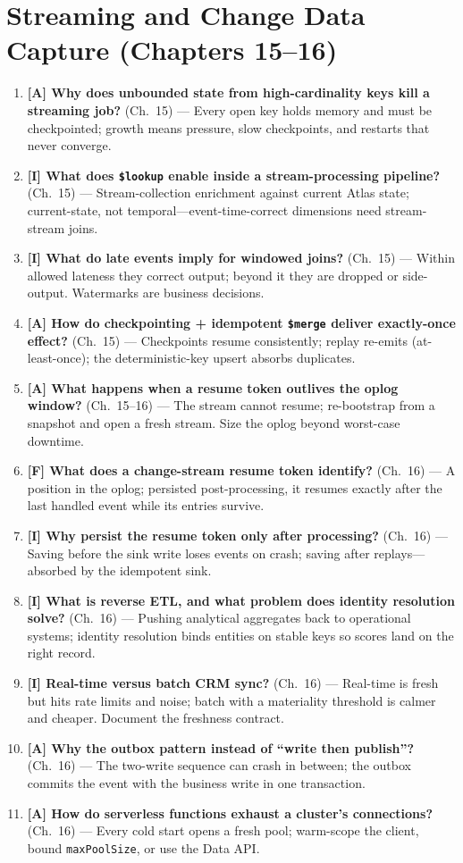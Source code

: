 \section{Streaming and Change Data Capture (Chapters 15--16)}
\begin{enumerate}
    \item \textbf{[A] Why does unbounded state from high-cardinality keys kill a streaming job?} (Ch.~15) --- Every open key holds memory and must be checkpointed; growth means pressure, slow checkpoints, and restarts that never converge.
    \item \textbf{[I] What does \texttt{\$lookup} enable inside a stream-processing pipeline?} (Ch.~15) --- Stream-collection enrichment against current Atlas state; current-state, not temporal---event-time-correct dimensions need stream-stream joins.
    \item \textbf{[I] What do late events imply for windowed joins?} (Ch.~15) --- Within allowed lateness they correct output; beyond it they are dropped or side-output. Watermarks are business decisions.
    \item \textbf{[A] How do checkpointing + idempotent \texttt{\$merge} deliver exactly-once effect?} (Ch.~15) --- Checkpoints resume consistently; replay re-emits (at-least-once); the deterministic-key upsert absorbs duplicates.
    \item \textbf{[A] What happens when a resume token outlives the oplog window?} (Ch.~15--16) --- The stream cannot resume; re-bootstrap from a snapshot and open a fresh stream. Size the oplog beyond worst-case downtime.
    \item \textbf{[F] What does a change-stream resume token identify?} (Ch.~16) --- A position in the oplog; persisted post-processing, it resumes exactly after the last handled event while its entries survive.
    \item \textbf{[I] Why persist the resume token only after processing?} (Ch.~16) --- Saving before the sink write loses events on crash; saving after replays---absorbed by the idempotent sink.
    \item \textbf{[I] What is reverse ETL, and what problem does identity resolution solve?} (Ch.~16) --- Pushing analytical aggregates back to operational systems; identity resolution binds entities on stable keys so scores land on the right record.
    \item \textbf{[I] Real-time versus batch CRM sync?} (Ch.~16) --- Real-time is fresh but hits rate limits and noise; batch with a materiality threshold is calmer and cheaper. Document the freshness contract.
    \item \textbf{[A] Why the outbox pattern instead of ``write then publish''?} (Ch.~16) --- The two-write sequence can crash in between; the outbox commits the event with the business write in one transaction.
    \item \textbf{[A] How do serverless functions exhaust a cluster's connections?} (Ch.~16) --- Every cold start opens a fresh pool; warm-scope the client, bound \texttt{maxPoolSize}, or use the Data API.
\end{enumerate}

